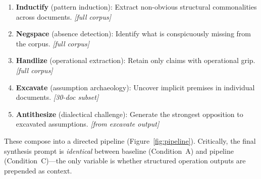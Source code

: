 \documentclass{article}
\begin{document}
\begin{enumerate}
    \item \textbf{Inductify} (pattern induction): Extract non-obvious structural commonalities across documents. \textit{[full corpus]}
    \item \textbf{Negspace} (absence detection): Identify what is conspicuously missing from the corpus. \textit{[full corpus]}
    \item \textbf{Handlize} (operational extraction): Retain only claims with operational grip. \textit{[full corpus]}
    \item \textbf{Excavate} (assumption archaeology): Uncover implicit premises in individual documents. \textit{[30-doc subset]}
    \item \textbf{Antithesize} (dialectical challenge): Generate the strongest opposition to excavated assumptions. \textit{[from excavate output]}
\end{enumerate}

These compose into a directed pipeline (Figure~\ref{fig:pipeline}). Critically, the final synthesis prompt is \textit{identical} between baseline (Condition~A) and pipeline (Condition~C)---the only variable is whether structured operation outputs are prepended as context.
\end{document}
